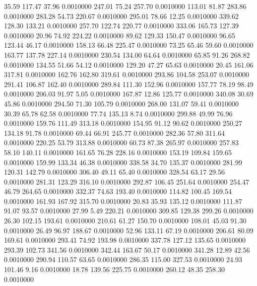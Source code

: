   35.59  117.47   37.96   0.0010000
 247.01   75.24  257.70   0.0010000
 113.01   81.87  283.86   0.0010000
 283.28   54.73  220.67   0.0010000
 295.01   78.66   12.25   0.0010000
 339.62  128.30  133.21   0.0010000
 257.70  122.74  220.77   0.0010000
 333.06  165.73  127.39   0.0010000
  20.96   74.92  224.22   0.0010000
  89.62  129.33  150.47   0.0010000
  96.65  123.44   46.17   0.0010000
 158.13   66.48  225.47   0.0010000
  73.25   65.46   59.60   0.0010000
 163.77  137.78  227.14   0.0010000
 230.54  134.00   64.64   0.0010000
  65.85   91.26  268.82   0.0010000
 134.55   51.66   54.12   0.0010000
 129.20   47.27   65.63   0.0010000
  20.45  161.06  317.81   0.0010000
 162.76  162.80  319.61   0.0010000
 293.86  104.58  253.07   0.0010000
 291.41  106.87  162.40   0.0010000
 289.84  111.30  152.96   0.0010000
 157.77   78.19   98.49   0.0010000
 206.03   91.97    5.05   0.0010000
 167.87   12.86  125.77   0.0010000
 340.08   30.69   45.86   0.0010000
 294.50   71.30  105.79   0.0010000
 268.00  131.07   59.41   0.0010000
  30.39   65.78   62.58   0.0010000
  77.74  135.13    8.74   0.0010000
 299.88   49.99   76.96   0.0010000
 159.76  111.49  313.18   0.0010000
 154.95   91.12   90.62   0.0010000
 250.27  134.18   91.78   0.0010000
  69.44   66.91  245.77   0.0010000
 282.36   57.80  311.64   0.0010000
 220.25   53.79  313.88   0.0010000
  60.73   87.38  265.97   0.0010000
 257.83   58.10  140.11   0.0010000
 161.65   76.28  228.16   0.0010000
 153.19  109.84  159.65   0.0010000
 159.99  133.34   46.38   0.0010000
 338.58   34.70  135.37   0.0010000
 281.99  120.31  142.79   0.0010000
 306.40   49.11   65.40   0.0010000
 328.54   63.17   29.56   0.0010000
 281.31  123.29  316.10   0.0010000
 292.87  106.45  251.64   0.0010000
 254.47   46.79  264.65   0.0010000
 332.37   74.63  193.40   0.0010000
 114.82  100.45  169.54   0.0010000
 161.93  167.92  315.70   0.0010000
  20.83   35.93  135.12   0.0010000
 111.87   91.07   93.57   0.0010000
  27.99    5.49  220.21   0.0010000
 309.85  129.38  299.26   0.0010000
  26.30  102.15  193.61   0.0010000
 210.61   61.27  150.70   0.0010000
 108.01   45.03   91.30   0.0010000
  26.49   96.97  188.67   0.0010000
  52.96  133.11   67.19   0.0010000
 206.61   80.09  169.61   0.0010000
 293.41   74.92  193.98   0.0010000
 337.78  127.12  135.65   0.0010000
 293.39  102.73  341.56   0.0010000
 342.44  163.67   50.17   0.0010000
 341.28   12.89   42.56   0.0010000
 290.94  110.57   63.65   0.0010000
 286.35  115.00  327.53   0.0010000
  24.93  101.46    9.16   0.0010000
  18.78  139.56  225.75   0.0010000
 260.12   48.35  258.30   0.0010000
